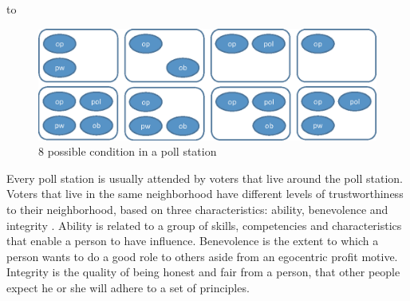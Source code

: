 \documentclass[JIP]{ipsj}
\begin{document}
\begin{table}[tb]
\caption{Agent \& Parameter}
\label{tab:modpar}
\hbox to
\end{table}

\begin{figure}[t]
\vbox{\large
  \hbox{\includegraphics[]{images/agents.eps}}}
\centerline{}
\caption{8 possible condition in a poll station}
\label{fig:8posinTPS}
\end{figure}

Every poll station is usually attended by voters that live around the poll station. Voters that live in the same neighborhood have different levels of trustworthiness to their neighborhood, based on three characteristics: ability, benevolence and integrity \cite{Mayer1995}. Ability is related to a group of skills, competencies and characteristics that enable a person to have influence. Benevolence is the extent to which a person wants to do a good role to others aside from an egocentric profit motive. Integrity is the quality of being honest and fair from a person, that other people expect he or she will adhere to a set of principles.
\end{document}

